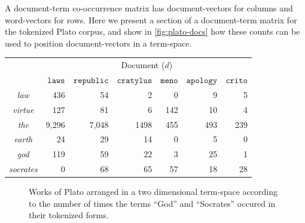 \begin{example}
  A document-term co-occurrence matrix has document-vectors for columns and word-vectors for rows. Here we present a section of a document-term matrix for the tokenized Plato corpus, and show in \autoref{fig:plato-docs} how these counts can be used to position document-vectors in a term-space.
  \begin{center}
  \captionsetup{width=.91\linewidth}
    \begin{tabular}{c r r r r r r}
      \toprule
      {\multicolumn{1}{c}{\raisebox{-11pt}{Term}}$\quad$} &
      \multicolumn{6}{c}{Document ($d$)} \\

      \cmidrule(lr){2-7}
      &
      $\texttt{laws}$ &
      $\texttt{republic}$ &
      $\texttt{cratylus}$ &
      $\texttt{meno}$ &
      $\texttt{apology}$ &
      $\texttt{crito}$ \\
      \midrule
      \emph{law}      & 436   & 54    & 2    & 0   & 9   & 5\\
      \emph{virtue}   & 127   & 81    & 6    & 142 & 10  & 4\\
      \emph{the}      & 9,296 & 7,048 & 1498 & 455 & 493 & 239\\
      \emph{earth}    & 24    & 29    & 14   & 0   & 5   & 0\\
      \emph{god}      & 119   & 59    & 22   & 3   & 25  & 1\\
      \emph{socrates} & 0     & 68    & 65   & 57  & 18  & 28\\
      \bottomrule
    \end{tabular}
    \label{tab:plato-doc-term}
    \end{center}
\end{example}
\par
\begin{figure}[H]
\begin{center}
\caption{Works of Plato arranged in a two dimensional term-space according to the number of times the terms ``God'' and ``Socrates'' occured in their tokenized forms.}\label{fig:plato-docs}
\end{center}
\end{figure}
